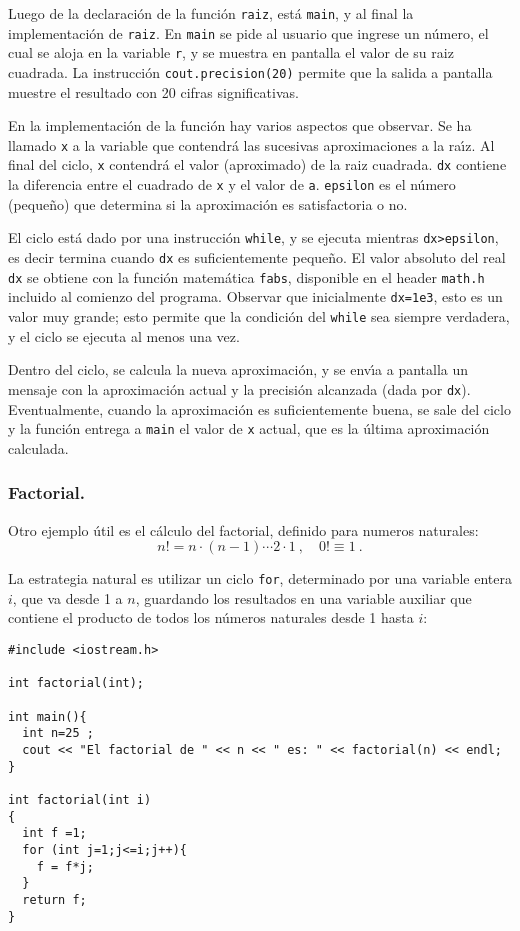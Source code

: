 Luego de la declaraci\'on de la funci\'on \verb+raiz+, est\'a
\verb+main+, y al final la implementaci\'on de \verb+raiz+. En
\verb+main+ se pide al usuario que ingrese un n\'umero, el cual se
aloja en la variable \verb+r+, y se muestra en pantalla el valor de su
raiz cuadrada. La instrucci\'on \verb+cout.precision(20)+ permite que
la salida a pantalla muestre el resultado con 20 cifras
significativas. 

En la implementaci\'on de la funci\'on hay varios aspectos que
observar. Se ha llamado \verb+x+ a la variable que contendr\'a las
sucesivas aproximaciones a la ra\'{\i}z. Al final del ciclo, \verb+x+
contendr\'a el valor (aproximado) de la raiz cuadrada. \verb+dx+
contiene la diferencia entre el cuadrado de \verb+x+ y el valor de
\verb+a+. \verb+epsilon+ es el n\'umero (peque\~no) que determina si
la aproximaci\'on es satisfactoria o no. 


El ciclo est\'a dado por una instrucci\'on \verb+while+, y se ejecuta
mientras \verb+dx>epsilon+, es decir termina cuando \verb+dx+ es
suficientemente peque\~no. El valor absoluto del real \verb+dx+ se
obtiene con la funci\'on matem\'atica \verb+fabs+, disponible en el
header \verb+math.h+ incluido al comienzo del programa.
Observar que inicialmente \verb+dx=1e3+,
esto es un valor muy grande; esto permite que la condici\'on del
\verb+while+ sea siempre verdadera, y el ciclo se ejecuta al menos una
vez. 

Dentro del ciclo, se calcula la nueva aproximaci\'on, y se env\'{\i}a
a pantalla un mensaje con la aproximaci\'on actual y la precisi\'on
alcanzada (dada por \verb+dx+). Eventualmente, cuando la
aproximaci\'on es suficientemente buena, se sale del ciclo y la
funci\'on entrega a \verb+main+ el valor de \verb+x+ actual, que es la
\'ultima aproximaci\'on calculada. 

\subsubsection{Factorial.}

Otro ejemplo \'util es el c\'alculo del factorial, definido para
numeros naturales:
$$ n! = n\cdot (n-1) \cdots 2\cdot 1 \ , \quad 0! \equiv 1 \ . $$

La estrategia natural es utilizar un ciclo \verb+for+, determinado por
una variable entera $i$, que va desde 1 a $n$, guardando los
resultados en una variable auxiliar que contiene el producto de todos
los n\'umeros naturales desde 1 hasta $i$:

\begin{verbatim}
#include <iostream.h>

int factorial(int);

int main(){
  int n=25 ;  
  cout << "El factorial de " << n << " es: " << factorial(n) << endl;
}

int factorial(int i)
{
  int f =1;
  for (int j=1;j<=i;j++){
    f = f*j;
  }
  return f;
}
\end{verbatim}


